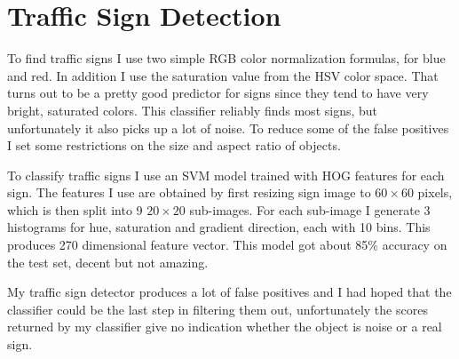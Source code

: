 \documentclass[12pt]{article}
\begin{document}
\section{Traffic Sign Detection}

To find traffic signs I use two simple RGB color normalization formulas, for blue and red. In addition I use the saturation value from the HSV color space. That turns out to be a pretty good predictor for signs since they tend to have very bright, saturated colors. This classifier reliably finds most signs, but unfortunately it also picks up a lot of noise. To reduce some of the false positives I set some restrictions on the size and aspect ratio of objects.

To classify traffic signs I use an SVM model trained with HOG features for each sign. The features I use are obtained by first resizing sign image to $60 \times 60$ pixels, which is then split into 9 $20 \times 20$ sub-images. For each sub-image I generate 3 histograms for hue, saturation and gradient direction, each with 10 bins. This produces 270 dimensional feature vector. This model got about 85\% accuracy on the test set, decent but not amazing.

 My traffic sign detector produces a lot of false positives and I had hoped that the classifier could be the last step in filtering them out, unfortunately the scores returned by my classifier give no indication whether the object is noise or a real sign.
\end{document}
